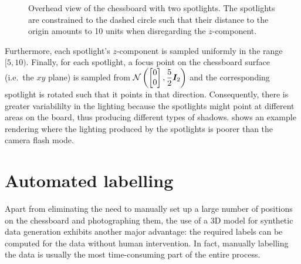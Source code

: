 \documentclass[../report.tex]{subfiles}
\begin{document}
\begin{enumerate}
\begin{figure}
            \caption[Overhead view of the chessboard with two spotlights.]{Overhead view of the chessboard with two spotlights. The spotlights are constrained to the dashed circle such that their distance to the origin amounts to 10 units when disregarding the $z$-component.}
            \label{fig:chessboard_lighting_circle}
        \end{figure}
        Furthermore, each spotlight's $z$-component is sampled uniformly in the range $[5, 10)$.
        Finally, for each spotlight, a focus point on the chessboard surface (i.e.\ the $xy$ plane) is sampled from
        \(
            \mathcal{N}\left(
                \begin{bmatrix}
                    0 \\ 0
                \end{bmatrix},
                \displaystyle \frac{5}{2} {\bm{I}}_2
            \right)
        \)
        and the corresponding spotlight is rotated such that it points in that direction.
        Consequently, there is greater variabililty in the lighting because the spotlights might point at different areas on the board, thus producing different types of shadows.
         shows an example rendering where the lighting produced by the spotlights is poorer than the camera flash mode.
\end{enumerate}

\section{Automated labelling}
\label{sec:automated_labelling}
Apart from eliminating the need to manually set up a large number of positions on the chessboard and photographing them, the use of a 3D model for synthetic data generation exhibits another major advantage:
the required labels can be computed for the data without human intervention.
In fact, manually labelling the data is usually the most time-consuming part of the entire process.
\end{document}
